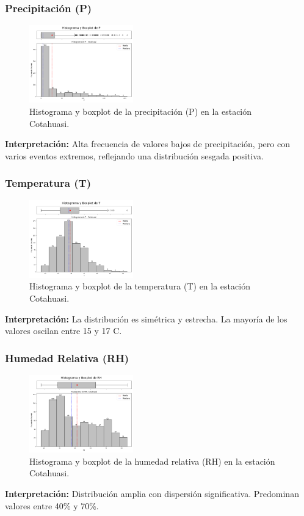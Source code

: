 \subsubsection*{Precipitación (P)}
\begin{figure}[H]
\centering
\includegraphics[width=0.4\textwidth]{resultados/por_estacion_meteorologica/Cotahuasi/P_histograma.png}
\caption{Histograma y boxplot de la precipitación (P) en la estación Cotahuasi.}
\label{fig:cotahuasi_P}
\end{figure}
\textbf{Interpretación:} Alta frecuencia de valores bajos de precipitación, pero con varios eventos extremos, reflejando una distribución sesgada positiva.

\subsubsection*{Temperatura (T)}
\begin{figure}[H]
\centering
\includegraphics[width=0.4\textwidth]{resultados/por_estacion_meteorologica/Cotahuasi/T_histograma.png}
\caption{Histograma y boxplot de la temperatura (T) en la estación Cotahuasi.}
\label{fig:cotahuasi_T}
\end{figure}
\textbf{Interpretación:} La distribución es simétrica y estrecha. La mayoría de los valores oscilan entre 15 y 17 \textdegree C.

\subsubsection*{Humedad Relativa (RH)}
\begin{figure}[H]
\centering
\includegraphics[width=0.4\textwidth]{resultados/por_estacion_meteorologica/Cotahuasi/RH_histograma.png}
\caption{Histograma y boxplot de la humedad relativa (RH) en la estación Cotahuasi.}
\label{fig:cotahuasi_RH}
\end{figure}
\textbf{Interpretación:} Distribución amplia con dispersión significativa. Predominan valores entre 40\% y 70\%.

